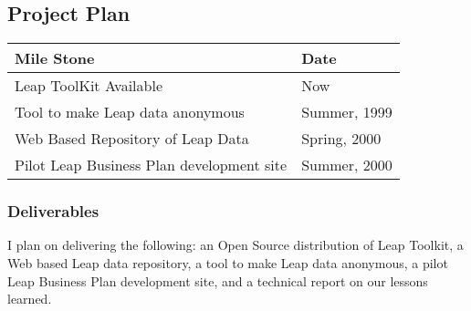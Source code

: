 







\subsection{Project Plan}
\begin{table}[htb]
  \begin{tabular}{ll}
    Mile Stone & Date \\ \hline
    Leap ToolKit Available& Now \\
    Tool to make Leap data anonymous& Summer, 1999 \\
    Web Based Repository of Leap Data& Spring, 2000 \\
    Pilot Leap Business Plan development site& Summer, 2000 \\ \hline
  \end{tabular}
\end{table}
      

\subsubsection{Deliverables}
I plan on delivering the following: an Open Source distribution of Leap
Toolkit, a Web based Leap data repository, a tool to make Leap data
anonymous, a pilot Leap Business Plan development site,  and a technical
report on our lessons learned.
